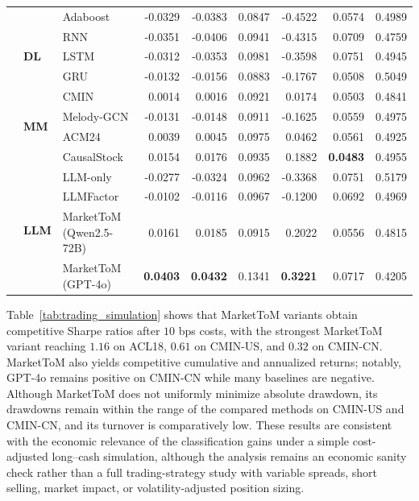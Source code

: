 \documentclass[a4paper,fleqn,doubleblind]{cas-sc}
\begin{document}
{\begin{table}[htbp]
{\begin{tabular}{lllrrrrrr}
 && Adaboost     & -0.0329 & -0.0383 & 0.0847 & -0.4522 & 0.0574 & 0.4989 \\
\cmidrule(l){2-9}
 & \multirow{3}{*}{\textbf{DL}}
    & RNN  & -0.0351 & -0.0406 & 0.0941 & -0.4315 & 0.0709 & 0.4759 \\
 && LSTM & -0.0312 & -0.0353 & 0.0981 & -0.3598 & 0.0751 & 0.4945 \\
 && GRU  & -0.0132 & -0.0156 & 0.0883 & -0.1767 & 0.0508 & 0.5049 \\
\cmidrule(l){2-9}
 & \multirow{4}{*}{\textbf{MM}}
    & CMIN        &  0.0014 &  0.0016 & 0.0921 &  0.0174 & 0.0503 & 0.4841 \\
 && Melody-GCN  & -0.0131 & -0.0148 & 0.0911 & -0.1625 & 0.0559 & 0.4975 \\
 && ACM24       &  0.0039 &  0.0045 & 0.0975 &  0.0462 & 0.0561 & 0.4925 \\
 && CausalStock &  0.0154 &  0.0176 & 0.0935 &  0.1882 & \textbf{0.0483} & 0.4955 \\
\cmidrule(l){2-9}
 & \multirow{4}{*}{\textbf{LLM}}
    & LLM-only                 & -0.0277 & -0.0324 & 0.0962 & -0.3368 & 0.0751 & 0.5179 \\
 && LLMFactor                & -0.0102 & -0.0116 & 0.0967 & -0.1200 & 0.0692 & 0.4969 \\
 && MarketToM (Qwen2.5-72B)  &  0.0161 &  0.0185 & 0.0915 &  0.2022 & 0.0556 & 0.4815 \\
 && MarketToM (GPT-4o)       & \textbf{0.0403} & \textbf{0.0432} & 0.1341 & \textbf{0.3221} & 0.0717 & 0.4205 \\
\bottomrule
\end{tabular}
}
\end{table}

Table~\ref{tab:trading_simulation} shows that MarketToM variants obtain competitive Sharpe ratios after $10$ bps costs, with the strongest MarketToM variant reaching $1.16$ on ACL18, $0.61$ on CMIN-US, and $0.32$ on CMIN-CN. MarketToM also yields competitive cumulative and annualized returns; notably, GPT-4o remains positive on CMIN-CN while many baselines are negative. Although MarketToM does not uniformly minimize absolute drawdown, its drawdowns remain within the range of the compared methods on CMIN-US and CMIN-CN, and its turnover is comparatively low. These results are consistent with the economic relevance of the classification gains under a simple cost-adjusted long--cash simulation, although the analysis remains an economic sanity check rather than a full trading-strategy study with variable spreads, short selling, market impact, or volatility-adjusted position sizing.
}
\end{document}
